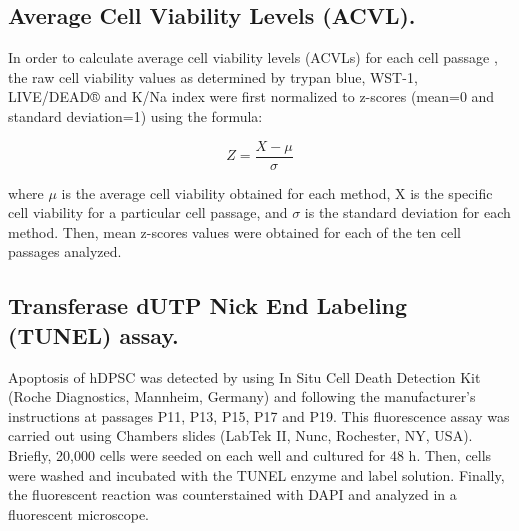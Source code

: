 \documentclass[a4paper,12pt]{article}
\begin{document}
\subsection{Average Cell Viability Levels (ACVL).}
In order to calculate average cell viability levels (ACVLs) for each cell passage \cite{RN206}, the raw cell viability values as determined by trypan blue, WST-1, LIVE/DEAD® and K/Na index were first normalized to z-scores (mean=0 and standard deviation=1) using the formula: 

$$Z=\frac{X-\mu}{\sigma}$$
 
where $\mu$ is the average cell viability obtained for each method, X is the specific cell viability for a particular cell passage, and $\sigma$ is the standard deviation for each method. Then, mean z-scores values were obtained for each of the ten cell passages analyzed.

\subsection{Transferase dUTP Nick End Labeling (TUNEL) assay.}
Apoptosis of hDPSC was detected by using In Situ Cell Death Detection Kit (Roche Diagnostics, Mannheim, Germany) and following the manufacturer's instructions at passages P11, P13, P15, P17 and P19. This fluorescence assay was carried out using Chambers slides (LabTek II, Nunc, Rochester, NY, USA). Briefly, 20,000 cells were seeded on each well and cultured for 48 h. Then, cells were washed and incubated with the TUNEL enzyme and label solution. Finally, the fluorescent reaction was counterstained with DAPI and analyzed in a fluorescent microscope.\\
\end{document}
